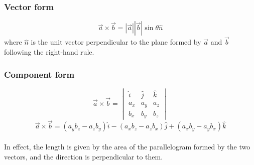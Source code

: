 \documentclass[a4paper,12pt]{article}
\begin{document}
\subsubsection{Vector form}
\begin{equation}
    \vec{a} \times \vec{b} = |\vec{a}| |\vec{b}| \sin\theta \hat{n}
\end{equation}
where \( \hat{n} \) is the unit vector perpendicular to the plane formed by \( \vec{a} \) and \( \vec{b} \) following the right-hand rule.
\subsubsection{Component form}
\begin{equation}
    \vec{a} \times \vec{b} = \begin{vmatrix}
        \hat{i} & \hat{j} & \hat{k} \\
        a_x     & a_y     & a_z     \\
        b_x     & b_y     & b_z
    \end{vmatrix}
\end{equation}
\begin{equation}
    \vec{a} \times \vec{b} = (a_y b_z - a_z b_y) \hat{i} - (a_x b_z - a_z b_x) \hat{j} + (a_x b_y - a_y b_x) \hat{k}
\end{equation} \\
In effect, the length is given by the area of the parallelogram formed by the two vectors, and the direction is perpendicular to them.

{}

\end{document}
